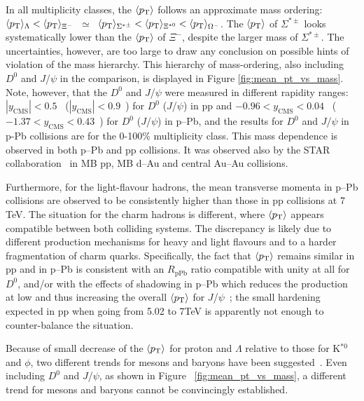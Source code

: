 In all multiplicity classes, the $\langle p_{\mathrm{T}}\rangle$ follows an approximate mass ordering: 
$\langle p_{\mathrm{T}}\rangle_{\Lambda}<\langle p_{\mathrm{T}}\rangle_{\Xi^-}$~$\simeq$~$\langle p_{\mathrm{T}}\rangle_{\Sigma^{*\pm}}<\langle p_{\mathrm{T}}\rangle_{\Xi^{*0}}<\langle p_{\mathrm{T}}\rangle_{\Omega^{-}}$.
The $\langle p_{\mathrm{T}}\rangle$ of $\Sigma^{*\pm}$ looks systematically lower than the $\langle p_{\mathrm{T}}\rangle$ of $\Xi^{-}$, despite the larger mass of 
$\Sigma^{*\pm}$. The uncertainties, however, are too large to draw any conclusion on 
possible hints of violation of the mass hierarchy. This hierarchy of mass-ordering, also including $D^0$ and 
$J$/$\psi$ in the comparison, is displayed in Figure \ref{fig:mean_pt_vs_mass}. Note, however, that the $D^0$ and $J$/$\psi$ were 
measured in different rapidity ranges: $|y_{\mathrm{CMS}}|<0.5$~\cite{cite:D0} ($|y_{\mathrm{CMS}}|<0.9$~\cite{cite:Jpsi_pp}) for $D^0$ ($J$/$\psi$) in pp and $-0.96 < y_{\mathrm{CMS}}< 0.04$~\cite{cite:D0} ($-1.37<y_{\mathrm{CMS}}<0.43$~\cite{cite:Jpsi_pPb}) for $D^0$ ($J$/$\psi$) in p--Pb, and the results for $D^0$ and $J$/$\psi$ in p-Pb collisions are for the 0-100\% multiplicity class. This mass dependence is observed in both p--Pb and pp collisions. 
It was observed also by the STAR collaboration~\cite{cite:STAR-hadronic_resonances-dAu} in MB pp, MB d--Au and central Au--Au collisions. 

Furthermore, for the light-flavour hadrons, the mean transverse momenta in p--Pb collisions are observed to be consistently higher than those in pp collisions at 7 TeV. The situation for the charm hadrons is different, where $\langle p_{\mathrm{T}}\rangle$ appears compatible between both colliding systems. The discrepancy is likely due to different production mechanisms for heavy and light flavours and to a harder fragmentation of charm quarks. Specifically, the fact that $\langle p_{\mathrm{T}}\rangle$ remains similar in pp and in p--Pb is consistent with an $R_{\mathrm{pPb}}$ ratio compatible with unity at all \pt \cite{cite:D0} for $D^0$, and/or 
with the effects of shadowing in p--Pb which reduces the production at low \pt and thus increasing the overall $\langle p_{\mathrm{T}}\rangle$ for $J$/$\psi$~\cite{cite:Jpsi_pPb}; the small \pt hardening expected in pp when going from 5.02 to 7TeV is apparently not enough to counter-balance the situation.

Because of small decrease of the $\langle p_{\mathrm{T}}\rangle$ for proton and $\Lambda$ relative to those for K$^{*0}$ and $\phi$, two different trends for mesons and baryons have been suggested~\cite{cite:mass_scaling}. Even including $D^0$ and $J$/$\psi$, as shown in Figure ~\ref{fig:mean_pt_vs_mass}, a different trend for 
mesons and baryons cannot be convincingly established.



